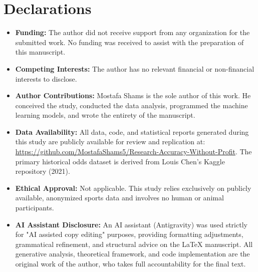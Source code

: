 \documentclass[pdflatex,sn-basic]{sn-jnl}
\begin{document}
\section*{Declarations}
\begin{itemize}
    \item \textbf{Funding:} The author did not receive support from any organization for the submitted work. No funding was received to assist with the preparation of this manuscript.
    \item \textbf{Competing Interests:} The author has no relevant financial or non-financial interests to disclose.
    \item \textbf{Author Contributions:} Mostafa Shams is the sole author of this work. He conceived the study, conducted the data analysis, programmed the machine learning models, and wrote the entirety of the manuscript.
    \item \textbf{Data Availability:} All data, code, and statistical reports generated during this study are publicly available for review and replication at: \url{https://github.com/MostafaShams5/Research-Accuracy-Without-Profit}. The primary historical odds dataset is derived from Louis Chen's Kaggle repository (2021).
    \item \textbf{Ethical Approval:} Not applicable. This study relies exclusively on publicly available, anonymized sports data and involves no human or animal participants.
    \item \textbf{AI Assistant Disclosure:} An AI assistant (Antigravity) was used strictly for "AI assisted copy editing" purposes, providing formatting adjustments, grammatical refinement, and structural advice on the LaTeX manuscript. All generative analysis, theoretical framework, and code implementation are the original work of the author, who takes full accountability for the final text.
\end{itemize}
\end{document}
